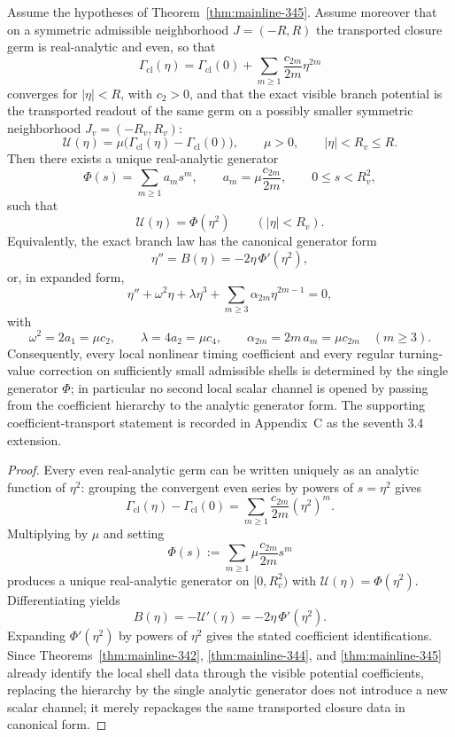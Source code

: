 \begin{theorem}
\label{thm:mainline-346}
Assume the hypotheses of Theorem~\ref{thm:mainline-345}. Assume moreover that on a symmetric admissible neighborhood $J=(-R,R)$ the transported closure germ is real-analytic and even, so that
\[
  \Gamma_{\mathrm{cl}}(\eta)
  =\Gamma_{\mathrm{cl}}(0)+\sum_{m\ge 1}\frac{c_{2m}}{2m}\eta^{2m}
\]
converges for $|\eta|<R$, with $c_2>0$, and that the exact visible branch potential is the transported readout of the same germ on a possibly smaller symmetric neighborhood $J_v=(-R_v,R_v)$:
\[
  \mathcal U(\eta)=\mu\bigl(\Gamma_{\mathrm{cl}}(\eta)-\Gamma_{\mathrm{cl}}(0)\bigr),
  \qquad \mu>0,
  \qquad |\eta|<R_v\le R.
\]
Then there exists a unique real-analytic generator
\[
  \Phi(s)=\sum_{m\ge 1} a_m s^m,
  \qquad a_m=\mu\frac{c_{2m}}{2m},
  \qquad 0\le s<R_v^2,
\]
such that
\[
  \mathcal U(\eta)=\Phi(\eta^2)
  \qquad (|\eta|<R_v).
\]
Equivalently, the exact branch law has the canonical generator form
\[
  \eta'' = B(\eta) = -2\eta\,\Phi'(\eta^2),
\]
or, in expanded form,
\[
  \eta'' + \omega^2\eta + \lambda\eta^3 + \sum_{m\ge 3}\alpha_{2m}\eta^{2m-1}=0,
\]
with
\[
  \omega^2=2a_1=\mu c_2,
  \qquad
  \lambda=4a_2=\mu c_4,
  \qquad
  \alpha_{2m}=2m\,a_m=\mu c_{2m}\quad (m\ge 3).
\]
Consequently, every local nonlinear timing coefficient and every regular turning-value correction on sufficiently small admissible shells is determined by the single generator $\Phi$; in particular no second local scalar channel is opened by passing from the coefficient hierarchy to the analytic generator form.
The supporting coefficient-transport statement is recorded in Appendix~C as the seventh 3.4 extension.
\end{theorem}

\begin{proof}
Every even real-analytic germ can be written uniquely as an analytic function of $\eta^2$: grouping the convergent even series by powers of $s=\eta^2$ gives
\[
  \Gamma_{\mathrm{cl}}(\eta)-\Gamma_{\mathrm{cl}}(0)
  =\sum_{m\ge 1}\frac{c_{2m}}{2m}(\eta^2)^m.
\]
Multiplying by $\mu$ and setting
\[
  \Phi(s):=\sum_{m\ge 1}\mu\frac{c_{2m}}{2m}s^m
\]
produces a unique real-analytic generator on $[0,R_v^2)$ with $\mathcal U(\eta)=\Phi(\eta^2)$. Differentiating yields
\[
  B(\eta)=-\mathcal U'(\eta)=-2\eta\,\Phi'(\eta^2).
\]
Expanding $\Phi'(\eta^2)$ by powers of $\eta^2$ gives the stated coefficient identifications. Since Theorems~\ref{thm:mainline-342}, \ref{thm:mainline-344}, and \ref{thm:mainline-345} already identify the local shell data through the visible potential coefficients, replacing the hierarchy by the single analytic generator does not introduce a new scalar channel; it merely repackages the same transported closure data in canonical form.
\end{proof}


